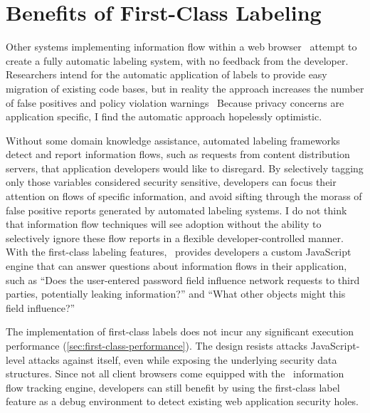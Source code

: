\section{Benefits of First-Class Labeling}


Other systems implementing information flow within a web browser~\cite{jang.etal+10,meyerovich.livshits+10,just.etal+11} attempt to create a fully automatic labeling system, with no feedback from the developer.
Researchers intend for the automatic application of labels to provide easy migration of existing code bases, but in reality the approach increases the number of false positives and policy violation warnings~\cite{sabelfeld.myers+03, slowinska.bos+09}
Because privacy concerns are application specific, I find the automatic approach hopelessly optimistic.

Without some domain knowledge assistance, automated labeling frameworks detect and report information flows, such as requests from content distribution servers, that application developers would like to disregard.
By selectively tagging only those variables considered security sensitive, developers can focus their attention on flows of specific information, and avoid sifting through the morass of false positive reports generated by automated labeling systems.
I do not think that information flow techniques will see adoption without the ability to selectively ignore these flow reports in a flexible developer-controlled manner.
With the first-class labeling features, \FlowCore\ provides developers a custom JavaScript engine that can answer questions about information flows in their application, such as ``Does the user-entered password field influence network requests to third parties, potentially leaking information?'' and ``What other objects might this field influence?''

The implementation of first-class labels does not incur any significant execution performance (\autoref{sec:first-class-performance}).
The design resists attacks JavaScript-level attacks against itself, even while exposing the underlying security data structures.
Since not all client browsers come equipped with the \FlowCore\ information flow tracking engine, developers can still benefit by using the first-class label feature as a debug environment to detect existing web application security holes.

